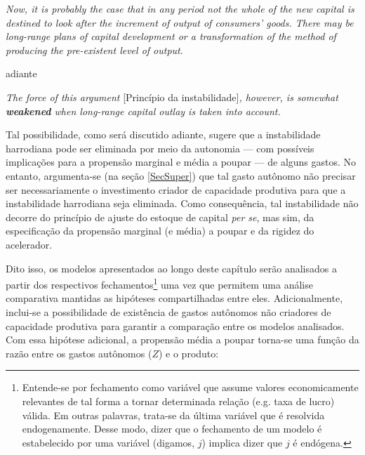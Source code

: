 \begin{citacao}
\textit{Now, it is probably the case that in any period not the whole of the new capital is destined to look after the increment of output of consumers' goods. There may be  long-range plans of capital development or a transformation  of the method of  producing  the pre-existent level of output}. \cite[p.~17]{harrod_essay_1939}
\end{citacao}
adiante
\begin{citacao}
\textit{The force  of this  argument} [Princípio da instabilidade]\textit{, however, is somewhat \textbf{weakened} when long-range  capital outlay is taken into account.}
\cite[p.~26, grifos adicionados]{harrod_essay_1939}
\end{citacao}
Tal possibilidade, como será discutido adiante, sugere que a instabilidade harrodiana pode ser eliminada por meio da autonomia --- com possíveis implicações para a propensão marginal e média a poupar ---  de alguns gastos.
No entanto, argumenta-se (na seção \ref{SecSuper}) que tal gasto autônomo não precisar ser necessariamente o investimento criador de capacidade produtiva para que a instabilidade harrodiana seja eliminada.
Como consequência, tal instabilidade não decorre do princípio de ajuste do estoque de capital \textit{per se}, mas sim, da especificação da propensão marginal (e média) a poupar e da rigidez do acelerador.

Dito isso, os modelos apresentados ao longo deste capítulo serão analisados a partir dos respectivos  fechamentos\footnote{Entende-se por fechamento como variável que assume valores economicamente relevantes de tal forma a tornar determinada relação (e.g. taxa de lucro) válida. Em outras palavras, trata-se da última variável que é resolvida endogenamente. Desse modo, dizer que o fechamento de um modelo é estabelecido por uma variável (digamos, $j$) implica dizer que $j$ é endógena.} uma vez que permitem uma análise comparativa mantidas as hipóteses compartilhadas entre eles. 
Adicionalmente, inclui-se a possibilidade de existência de gastos autônomos não criadores de capacidade produtiva para garantir a comparação entre os modelos analisados. Com essa hipótese adicional, a propensão média a poupar torna-se uma função da razão entre os gastos autônomos ($Z$) e o produto:

